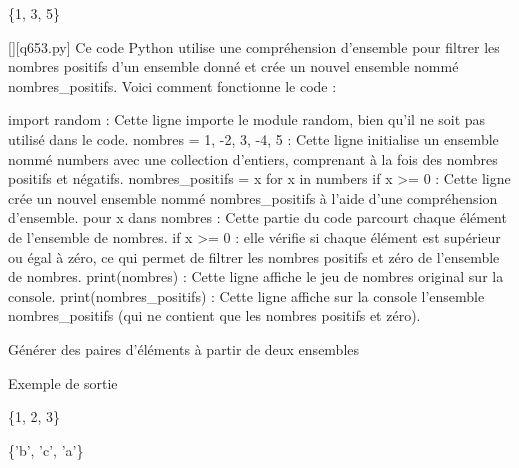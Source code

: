 \{1, 3, 5\}
        \par
        \begin{solution}
            \renewcommand{\nomfichier}{q653.py}
            \pythonfile{\chemincode \nomfichier}[][\nomfichier]
            Ce code Python utilise une compréhension d'ensemble pour filtrer les nombres positifs d'un ensemble donné et crée un nouvel ensemble nommé nombres_positifs. Voici comment fonctionne le code :

    import random : Cette ligne importe le module random, bien qu'il ne soit pas utilisé dans le code.
    nombres = {1, -2, 3, -4, 5} : Cette ligne initialise un ensemble nommé numbers avec une collection d'entiers, comprenant à la fois des nombres positifs et négatifs.
    nombres_positifs = {x for x in numbers if x >= 0} : Cette ligne crée un nouvel ensemble nommé nombres_positifs à l'aide d'une compréhension d'ensemble.
        pour x dans nombres : Cette partie du code parcourt chaque élément de l'ensemble de nombres.
        if x >= 0 : elle vérifie si chaque élément est supérieur ou égal à zéro, ce qui permet de filtrer les nombres positifs et zéro de l'ensemble de nombres.
    print(nombres) : Cette ligne affiche le jeu de nombres original sur la console.
    print(nombres_positifs) : Cette ligne affiche sur la console l'ensemble nombres_positifs (qui ne contient que les nombres positifs et zéro).
        \end{solution}
        

        \question
        Générer des paires d'éléments à partir de deux ensembles

Exemple de sortie

\{1, 2, 3\}

\{'b', 'c', 'a'\}

